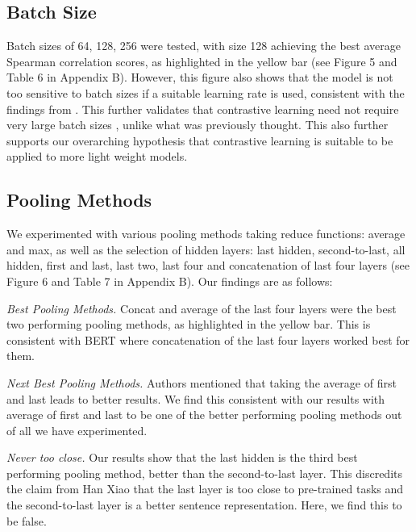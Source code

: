 \documentclass[10pt,twocolumn,letterpaper]{article}
\begin{document}
\subsection{Batch Size}

Batch sizes of 64, 128, 256 were tested, with size 128 achieving the best average Spearman correlation scores, as highlighted in the yellow bar (see Figure 5 and Table 6 in Appendix B). However, this figure also shows that the model is not too sensitive to batch sizes if a suitable learning rate is used, consistent with the findings from \cite{2104.08821}. This further validates that contrastive learning need not require very large batch sizes \cite{2104.08821}, unlike what was previously thought\cite{2002.05709}. This also further supports our overarching hypothesis that contrastive learning is suitable to be applied to more light weight models.

\subsection{Pooling Methods}

We experimented with various pooling methods taking reduce functions: average and max, as well as the selection of hidden layers: last hidden, second-to-last, all hidden, first and last, last two, last four and concatenation of last four layers (see Figure 6 and Table 7 in Appendix B). Our findings are as follows:

\textit{Best Pooling Methods.} Concat and average of the last four layers were the best two performing pooling methods, as highlighted in the yellow bar. This is consistent with BERT \cite{1907.11692} where concatenation of the last four layers worked best for them.

\textit{Next Best Pooling Methods.} Authors \cite{li-etal-2020-sentence} \cite{https://doi.org/10.48550/arxiv.1908.10084} mentioned that taking the average of first and last leads to better results. We find this consistent with our results with average of first and last to be one of the better performing pooling methods out of all we have experimented.

\textit{Never too close.} Our results show that the last hidden is the third best performing pooling method, better than the second-to-last layer. This discredits the claim from Han Xiao \cite{bert.as.service} that the last layer is too close to pre-trained tasks and the second-to-last layer is a better sentence representation. Here, we find this to be false.
\end{document}
